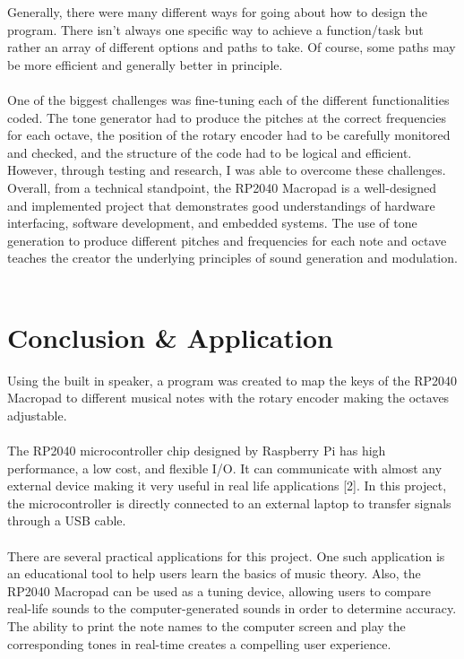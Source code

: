 \documentclass{article}
\begin{document}
Generally, there were many different ways for going about how to design the program. There isn't always one specific way to achieve a function/task but rather an array of different options and paths to take. Of course, some paths may be more efficient and generally better in principle. \\\\

One of the biggest challenges was  fine-tuning each of the different functionalities coded. The tone generator had to produce the pitches at the correct frequencies for each octave, the position of the rotary encoder had to be carefully monitored and checked, and the structure of the code had to be logical and efficient. However, through testing and research, I was able to overcome these challenges. Overall, from a technical standpoint, the RP2040 Macropad is a well-designed and implemented project that demonstrates good understandings of hardware interfacing, software development, and embedded systems. The use of tone generation to produce different pitches and frequencies for each note and octave teaches the creator the underlying principles of sound generation and modulation.\\\\

\section{Conclusion \& Application}

\hspace{1cm} Using the built in speaker, a program was created to map the keys of the RP2040 Macropad to different musical notes with the rotary encoder making the octaves adjustable.\\\\

The RP2040 microcontroller chip designed by Raspberry Pi has high performance, a low cost, and flexible I/O. It can communicate with almost any external device making it very useful in real life applications [2]. In this project, the microcontroller is directly connected to an external laptop to transfer signals through a USB cable. \\\\

There are several practical applications for this project. One such application is an educational tool to help users learn the basics of music theory. Also, the RP2040 Macropad can be used as a tuning device, allowing users to compare real-life sounds to the computer-generated sounds in order to determine accuracy. The ability to print the note names to the computer screen and play the corresponding tones in real-time creates a compelling user experience. \\\\
\end{document}
